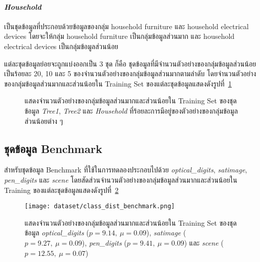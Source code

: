 \paragraph{\emph{Household}}
เป็นชุดข้อมูลที่ประกอบด้วยข้อมูลของกลุ่ม household furniture และ household electrical devices โดยจะให้กลุ่ม household furniture เป็นกลุ่มข้อมูลส่วนมาก และ household electrical devices เป็นกลุ่มข้อมูลส่วนน้อย
\newline

แต่ละชุดข้อมูลย่อยจะถูกแบ่งออกเป็น 3 ชุด ก็คือ ชุดข้อมูลที่มีจำนวนตัวอย่างของกลุ่มข้อมูลส่วนน้อยเป็นร้อยละ 20, 10 และ 5 ของจำนวนตัวอย่างของกลุ่มข้อมูลส่วนมากตามลำดับ โดยจำนวนตัวอย่างของกลุ่มข้อมูลส่วนมากและส่วนน้อยใน Training Set ของแต่ละชุดข้อมูลแสดงดังรูปที่~\ref{fig:dist-cifar100}

\begin{figure}[h]
  \centering
  \caption{แสดงจำนวนตัวอย่างของกลุ่มข้อมูลส่วนมากและส่วนน้อยใน Training Set ของชุดข้อมูล \emph{Tree1}, \emph{Tree2} และ \emph{Household} ที่ร้อยละการมีอยู่ของตัวอย่างของกลุ่มข้อมูลส่วนน้อยต่าง ๆ}
  \label{fig:dist-cifar100}
\end{figure}
\FloatBarrier

\subsection{ชุดข้อมูล Benchmark}
สำหรับชุดข้อมูล Benchmark ที่ใช้ในการทดลองประกอบไปด้วย \textit{optical\_digits}, \emph{satimage}, \textit{pen\_digits} และ \emph{scene} โดยสัดส่วนจำนวนตัวอย่างของกลุ่มข้อมูลส่วนมากและส่วนน้อยใน Training ของแต่ละชุดข้อมูลแสดงดังรูปที่~\ref{fig:dist-benchmark}

\begin{figure}[h]
  \centering
   \texttt{[image: dataset/class\_dist\_benchmark.png]}
  \caption{แสดงจำนวนตัวอย่างของกลุ่มข้อมูลส่วนมากและส่วนน้อยใน Training Set ของชุดข้อมูล \textit{optical\_digits} ($p = 9.14,~\mu = 0.09$), \emph{satimage} ($p = 9.27,~\mu = 0.09$), \textit{pen\_digits} ($p = 9.41,~\mu = 0.09$) และ \emph{scene} ($p = 12.55,~\mu = 0.07$)}
  \label{fig:dist-benchmark}
\end{figure}
\FloatBarrier

